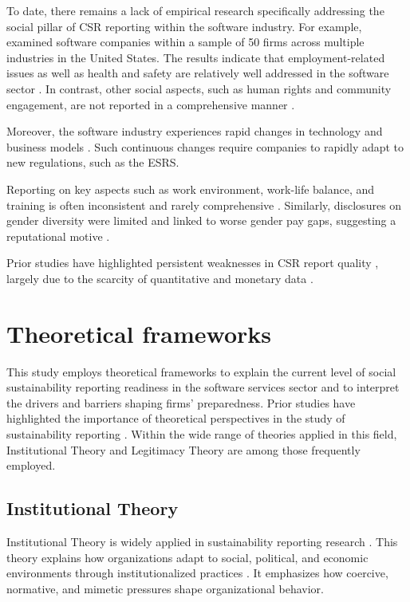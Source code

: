 To date, there remains a lack of empirical research specifically addressing the social pillar of CSR reporting 
within the software industry. For example, \textcite{Holder-Webb2009} examined software companies within a sample 
of 50 firms across multiple industries in the United States. The results indicate that employment-related issues 
as well as health and safety are relatively well addressed in the software sector \parencite{Holder-Webb2009}. 
In contrast, other social aspects, such as human rights and community engagement, are not reported in a 
comprehensive manner \parencite{Holder-Webb2009}.

Moreover, the software industry experiences rapid changes in technology and business models \parencite{Buxmann2015}.
Such continuous changes require companies to rapidly adapt to new regulations, such as the ESRS. 




Reporting on key aspects such as work environment, work-life balance, 
and training is often inconsistent and rarely comprehensive \parencite{Greig2021}. Similarly,
disclosures on gender diversity were limited and linked to worse gender pay gaps,
suggesting a reputational motive \parencite{Huang2022}.


Prior studies have highlighted 
persistent weaknesses in CSR report quality \parencite{DiChiacchio2024}, largely due to the scarcity of 
quantitative and monetary data \parencite{Michelon2015}.










\section{Theoretical frameworks}

This study employs theoretical frameworks to explain the current level 
of social sustainability reporting readiness in the software services sector 
and to interpret the drivers and barriers shaping firms' preparedness.
Prior studies have highlighted the importance of theoretical perspectives 
in the study of sustainability reporting \parencite{Gesso2023, Rezaee2016, Lozano2015}.
Within the wide range of theories applied in this field, Institutional Theory
and Legitimacy Theory are among those frequently employed.

\subsection{Institutional Theory}
Institutional Theory is widely applied in sustainability 
reporting research \parencite{Campbell2007}. This theory explains 
how organizations adapt to social, political, and economic environments 
through institutionalized practices 
\parencite{Meyer1977, DiMaggio1983}.
It emphasizes how coercive, normative, and mimetic pressures shape organizational behavior.


